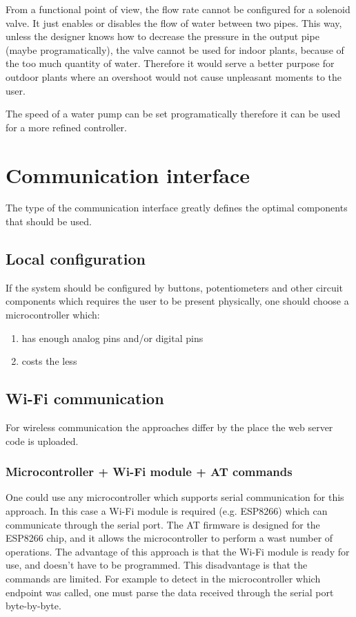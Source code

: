 From a functional point of view, the flow rate cannot be configured for a solenoid valve. It just enables or disables the flow of water between two pipes. This way, unless the designer knows how to decrease the pressure in the output pipe (maybe programatically), the valve cannot be used for indoor plants, because of the too much quantity of water. Therefore it would serve a better purpose for outdoor plants where an overshoot would not cause unpleasant moments to the user.

The speed of a water pump can be set programatically therefore it can be used for a more refined controller.



\section{Communication interface}

The type of the communication interface greatly defines the optimal components that should be used.

\subsection{Local configuration}

If the system should be configured by buttons, potentiometers and other circuit components which requires the user to be present physically, one should choose a microcontroller which:

\begin{enumerate}
 \item has enough analog pins and/or digital pins
 \item costs the less
\end{enumerate}



\subsection{Wi-Fi communication}

For wireless communication the approaches differ by the place the web server code is uploaded.

\subsubsection{Microcontroller + Wi-Fi module + AT commands}

One could use any microcontroller which supports serial communication for this approach. In this case a Wi-Fi module is required (e.g. ESP8266) which can communicate through the serial port. The AT firmware is designed for the ESP8266 chip, and it allows the microcontroller to perform a wast number of operations. The advantage of this approach is that the Wi-Fi module is ready for use, and doesn't have to be programmed. This disadvantage is that the commands are limited. For example to detect in the microcontroller which endpoint was called, one must parse the data received through the serial port byte-by-byte.

